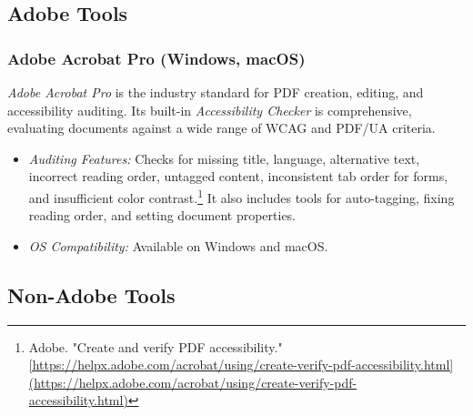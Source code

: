 \subsection{Adobe Tools}
\label{subsec:adobe-tools}
\subsubsection{Adobe Acrobat Pro (Windows, macOS)}
\label{subsubsec:acrobat-pro}
\emph{Adobe Acrobat Pro} is the industry standard for PDF creation, editing, and accessibility auditing. Its built-in \emph{Accessibility Checker} is comprehensive, evaluating documents against a wide range of WCAG and PDF/UA criteria.
\begin{itemize}
\item \emph{Auditing Features:} Checks for missing title, language, alternative text, incorrect reading order, untagged content, inconsistent tab order for forms, and insufficient color contrast.\footnote{Adobe. "Create and verify PDF accessibility." \url{[https://helpx.adobe.com/acrobat/using/create-verify-pdf-accessibility.html](https://helpx.adobe.com/acrobat/using/create-verify-pdf-accessibility.html)}} It also includes tools for auto-tagging, fixing reading order, and setting document properties.
\item \emph{OS Compatibility:} Available on Windows and macOS.
\end{itemize}

\subsection{Non-Adobe Tools}
\label{subsec:non-adobe-tools}
